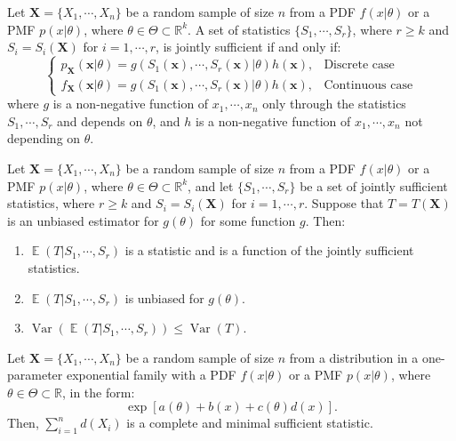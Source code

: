 \documentclass{huhtakm-template-book-v2}
\DeclareMathOperator{\E}{\mathbb{E}}
\DeclareMathOperator{\Var}{Var}
\begin{document}
    \begin{thm}
        Let $\mathbf{X}=\{X_{1},\cdots,X_{n}\}$ be a random sample of size $n$ from a PDF $f(x|\theta)$ or a PMF $p(x|\theta)$, where $\theta\in\Theta\subset\mathbb{R}^{k}$. A set of statistics $\{S_{1},\cdots,S_{r}\}$, where $r\geq k$ and $S_{i}=S_{i}(\mathbf{X})$ for $i=1,\cdots,r$, is jointly sufficient if and only if:
        \begin{equation*}
            \begin{cases}
                p_{\mathbf{X}}(\mathbf{x}|\theta)=g(S_{1}(\mathbf{x}),\cdots,S_{r}(\mathbf{x})|\theta)h(\mathbf{x}), &\text{Discrete case}\\
                f_{\mathbf{X}}(\mathbf{x}|\theta)=g(S_{1}(\mathbf{x}),\cdots,S_{r}(\mathbf{x})|\theta)h(\mathbf{x}), &\text{Continuous case}
            \end{cases}
        \end{equation*}
        where $g$ is a non-negative function of $x_{1},\cdots,x_{n}$ only through the statistics $S_{1},\cdots,S_{r}$ and depends on $\theta$, and $h$ is a non-negative function of $x_{1},\cdots,x_{n}$ not depending on $\theta$.
    \end{thm}
    \begin{thm}
        Let $\mathbf{X}=\{X_{1},\cdots,X_{n}\}$ be a random sample of size $n$ from a PDF $f(x|\theta)$ or a PMF $p(x|\theta)$, where $\theta\in\Theta\subset\mathbb{R}^{k}$, and let $\{S_{1},\cdots,S_{r}\}$ be a set of jointly sufficient statistics, where $r\geq k$ and $S_{i}=S_{i}(\mathbf{X})$ for $i=1,\cdots,r$. Suppose that $T=T(\mathbf{X})$ is an unbiased estimator for $g(\theta)$ for some function $g$. Then:
        \begin{enumerate}
            \item $\E(T|S_{1},\cdots,S_{r})$ is a statistic and is a function of the jointly sufficient statistics.
            \item $\E(T|S_{1},\cdots,S_{r})$ is unbiased for $g(\theta)$.
            \item $\Var(\E(T|S_{1},\cdots,S_{r}))\leq\Var(T)$.
        \end{enumerate}
    \end{thm}
    \begin{thm}
        Let $\mathbf{X}=\{X_{1},\cdots,X_{n}\}$ be a random sample of size $n$ from a distribution in a one-parameter exponential family with a PDF $f(x|\theta)$ or a PMF $p(x|\theta)$, where $\theta\in\Theta\subset\mathbb{R}$, in the form:
        \begin{equation*}
            \exp[a(\theta)+b(x)+c(\theta)d(x)].
        \end{equation*}
        Then, $\sum_{i=1}^{n}d(X_{i})$ is a complete and minimal sufficient statistic.
    \end{thm}
\end{document}
